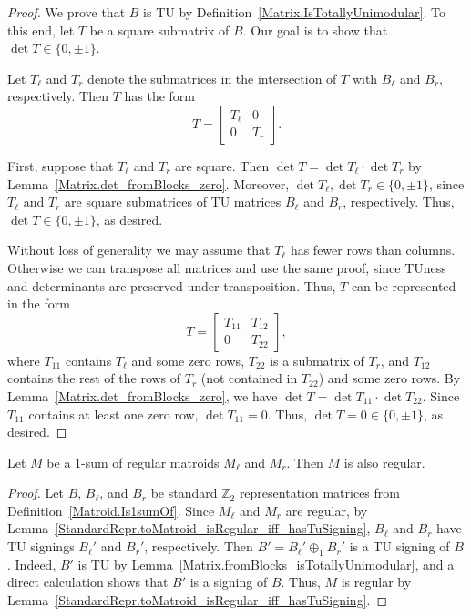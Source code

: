 \begin{proof}
    \leanok
    We prove that $B$ is TU by Definition~\ref{Matrix.IsTotallyUnimodular}. To this end, let $T$ be a square submatrix of $B$. Our goal is to show that $\det T \in \{0, \pm 1\}$.

    Let $T_{\ell}$ and $T_{r}$ denote the submatrices in the intersection of $T$ with $B_{\ell}$ and $B_{r}$, respectively. Then $T$ has the form
    \[
        T = \begin{bmatrix} T_{\ell} & 0 \\ 0 & T_{r} \end{bmatrix}.
    \]

    First, suppose that $T_{\ell}$ and $T_{r}$ are square. Then $\det T = \det T_{\ell} \cdot \det T_{r}$ by Lemma~\ref{Matrix.det_fromBlocks_zero}. Moreover, $\det T_{\ell}, \det T_{r} \in \{0, \pm 1\}$, since $T_{\ell}$ and $T_{r}$ are square submatrices of TU matrices $B_{\ell}$ and $B_{r}$, respectively. Thus, $\det T \in \{0, \pm 1\}$, as desired.

    Without loss of generality we may assume that $T_{\ell}$ has fewer rows than columns. Otherwise we can transpose all matrices and use the same proof, since TUness and determinants are preserved under transposition. Thus, $T$ can be represented in the form
    \[
        T = \begin{bmatrix} T_{11} & T_{12} \\ 0 & T_{22} \end{bmatrix},
    \]
    where $T_{11}$ contains $T_{\ell}$ and some zero rows, $T_{22}$ is a submatrix of $T_{r}$, and $T_{12}$ contains the rest of the rows of $T_{r}$ (not contained in $T_{22}$) and some zero rows. By Lemma~\ref{Matrix.det_fromBlocks_zero}, we have $\det T = \det T_{11} \cdot \det T_{22}$. Since $T_{11}$ contains at least one zero row, $\det T_{11} = 0$. Thus, $\det T = 0 \in \{0, \pm 1\}$, as desired.
\end{proof}

\begin{theorem}
    \label{Matroid.Is1sumOf.isRegular}
    \leanok
    Let $M$ be a $1$-sum of regular matroids $M_{\ell}$ and $M_{r}$. Then $M$ is also regular.
\end{theorem}

\begin{proof}
    \leanok
    Let $B$, $B_{\ell}$, and $B_{r}$ be standard $\mathbb{Z}_{2}$ representation matrices from Definition~\ref{Matroid.Is1sumOf}. Since $M_{\ell}$ and $M_{r}$ are regular, by Lemma~\ref{StandardRepr.toMatroid_isRegular_iff_hasTuSigning}, $B_{\ell}$ and $B_{r}$ have TU signings $B_{\ell}'$ and $B_{r}'$, respectively. Then $B' = B_{\ell}' \oplus_{1} B_{r}'$ is a TU signing of $B$. Indeed, $B'$ is TU by Lemma~\ref{Matrix.fromBlocks_isTotallyUnimodular}, and a direct calculation shows that $B'$ is a signing of $B$. Thus, $M$ is regular by Lemma~\ref{StandardRepr.toMatroid_isRegular_iff_hasTuSigning}.
\end{proof}
